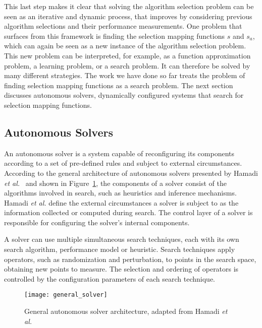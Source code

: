 This last step makes it clear that solving the algorithm selection problem can
be seen as an iterative and dynamic process, that improves by considering
previous algorithm selections and their performance measurements. One problem
that surfaces from this framework is finding the selection mapping functions
$s$ and $s_{a}$, which can again be seen as a new instance of the algorithm
selection problem. This new problem can be interpreted, for example, as a
function approximation problem, a learning problem, or a search problem.  It
can therefore be solved by many different strategies.  The work we have done so
far treats the problem of finding selection mapping functions as a search
problem. The next section discusses autonomous solvers, dynamically configured
systems that search for selection mapping functions.

\subsection{Autonomous Solvers}

An autonomous solver is a system capable of reconfiguring its components
according to a set of pre-defined rules and subject to external circumstances.
According to the general architecture of autonomous solvers presented by Hamadi
\emph{et al.}~\cite{hamadi2011autonomous, hamadi2012autonomous} and shown in
Figure~\ref{fig:general_solver}, the components of a solver consist of the
algorithms involved in search, such as heuristics and inference mechanisms.
Hamadi \emph{et al.} define the external circumstances a solver is subject to
as the information collected or computed during search.  The control layer of a
solver is responsible for configuring the solver's internal components.

A solver can use multiple simultaneous search techniques, each with its own
search algorithm, performance model or heuristic. Search techniques apply
operators, such as randomization and perturbation, to points in the search
space, obtaining new points to measure. The selection and ordering of operators
is controlled by the configuration parameters of each search technique.

\begin{figure}[htpb]
    \centering
    \texttt{[image: general\_solver]}
    \caption{General autonomous solver architecture, adapted from Hamadi \emph{et al.}~\cite{hamadi2012autonomous}}
    \label{fig:general_solver}
\end{figure}


